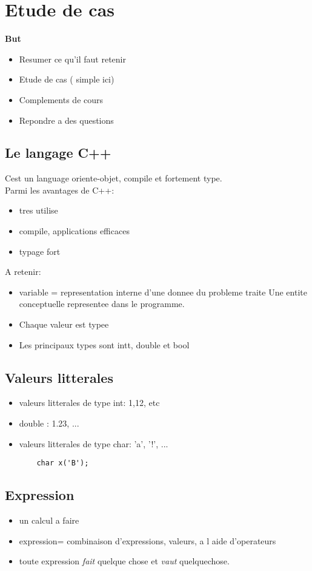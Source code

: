 \documentclass[../main.tex]{subfiles}
\begin{document}
\section{Etude de cas}

\textbf{ But }
\begin{itemize}
	\item Resumer ce qu'il faut retenir
	\item Etude de cas ( simple ici)
	\item Complements de cours
	\item Repondre a des questions
\end{itemize}
\subsection{Le langage C++}
Cest un language oriente-objet, compile et fortement type.\\
Parmi les avantages de C++:
\begin{itemize}
	\item tres utilise
	\item compile, applications efficaces
	\item typage fort
\end{itemize}
A retenir:
\begin{itemize}
	\item variable = representation interne d'une donnee du probleme traite
	Une entite conceptuelle representee dans le programme.
	\item Chaque valeur est typee
	\item Les principaux types sont intt, double et bool
\end{itemize}
\subsection{Valeurs litterales}
\begin{itemize}
	\item valeurs litterales de type int: 1,12, etc
	\item double : 1.23, ...
	\item valeurs litterales de type char: 'a', '!', ...
	\begin{lstlisting}
	char x('B'); \end{lstlisting}
	
\end{itemize}
\subsection{Expression}
\begin{itemize}
	\item un calcul a faire
	\item expression= combinaison d'expressions, valeurs, a l aide d'operateurs
	\item toute expression \textit{fait} quelque chose et \textit{vaut} quelquechose.

\end{itemize}
\end{document}
